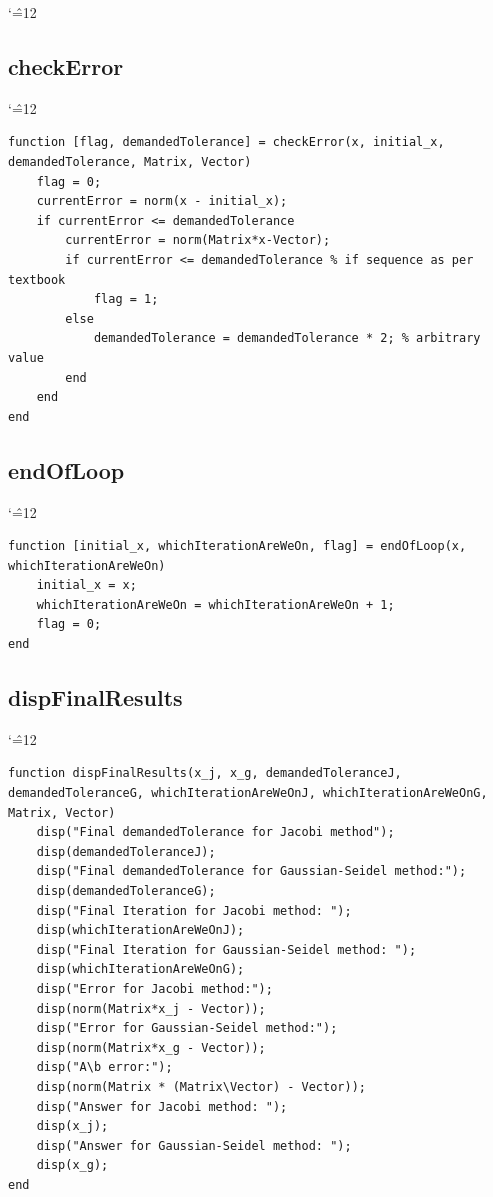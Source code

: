 \documentclass[12pt]{report}
\newenvironment{simplechar}{%
   \catcode`\^=12
}{}
\begin{document}
\begin{simplechar}
\subsection{checkError}
\begin{simplechar}
\begin{lstlisting}
function [flag, demandedTolerance] = checkError(x, initial_x, demandedTolerance, Matrix, Vector)
    flag = 0;
    currentError = norm(x - initial_x);
    if currentError <= demandedTolerance
        currentError = norm(Matrix*x-Vector);
        if currentError <= demandedTolerance % if sequence as per textbook
            flag = 1;
        else
            demandedTolerance = demandedTolerance * 2; % arbitrary value
        end
    end
end
\end{lstlisting}
\end{simplechar}

\newpage
\subsection{endOfLoop}
\begin{simplechar}
\begin{lstlisting}
function [initial_x, whichIterationAreWeOn, flag] = endOfLoop(x, whichIterationAreWeOn)
    initial_x = x;
    whichIterationAreWeOn = whichIterationAreWeOn + 1;
    flag = 0;
end
\end{lstlisting}
\end{simplechar}

\subsection{dispFinalResults}
\begin{simplechar}
\begin{lstlisting}
function dispFinalResults(x_j, x_g, demandedToleranceJ, demandedToleranceG, whichIterationAreWeOnJ, whichIterationAreWeOnG, Matrix, Vector)
    disp("Final demandedTolerance for Jacobi method");
    disp(demandedToleranceJ);
    disp("Final demandedTolerance for Gaussian-Seidel method:");
    disp(demandedToleranceG);
    disp("Final Iteration for Jacobi method: ");
    disp(whichIterationAreWeOnJ);
    disp("Final Iteration for Gaussian-Seidel method: ");
    disp(whichIterationAreWeOnG);
    disp("Error for Jacobi method:");
    disp(norm(Matrix*x_j - Vector));
    disp("Error for Gaussian-Seidel method:");
    disp(norm(Matrix*x_g - Vector));
    disp("A\b error:");
    disp(norm(Matrix * (Matrix\Vector) - Vector));
    disp("Answer for Jacobi method: ");
    disp(x_j);
    disp("Answer for Gaussian-Seidel method: ");
    disp(x_g);
end
\end{lstlisting}
\end{simplechar}


\end{simplechar}
\end{document}
